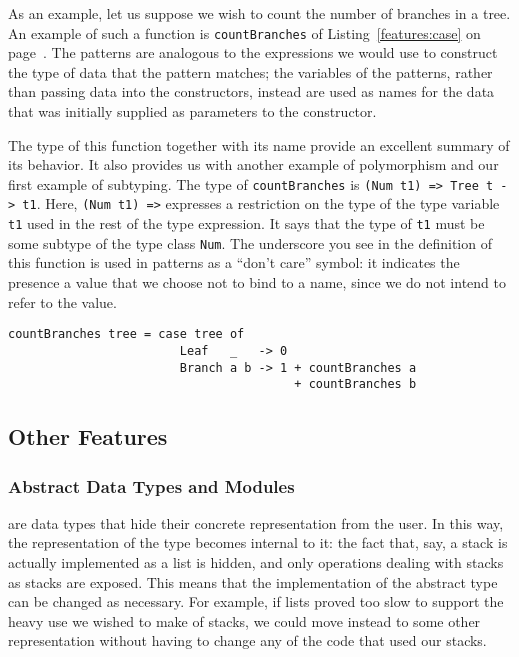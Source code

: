 As an example, let us suppose we wish to count the number of branches in a tree. An example of such a function is \lstinline{countBranches} of Listing~\ref{features:case} on page~\pageref{features:case}. The patterns are analogous to the expressions we would use to construct the type of data that the pattern matches; the variables of the patterns, rather than passing data into the constructors, instead are used as names for the data that was initially supplied as parameters to the constructor.

The type of this function together with its name provide an excellent summary of its behavior. It also provides us with another example of polymorphism and our first example of subtyping. The type of \lstinline{countBranches} is \lstinline{(Num t1) => Tree t -> t1}. Here, \lstinline{(Num t1) =>} expresses a restriction on the type of the type variable \lstinline{t1} used in the rest of the type expression. It says that the type of \lstinline{t1} must be some subtype of the type class \lstinline{Num}. The underscore you see in the definition of this function is used in patterns as a ``don't care'' symbol: it indicates the presence a value that we choose not to bind to a name, since we do not intend to refer to the value.

\begin{lstlisting}[float,caption={Pattern-matching via \code{case}},label={features:case}]
countBranches tree = case tree of
                        Leaf   _   -> 0
                        Branch a b -> 1 + countBranches a
                                        + countBranches b
\end{lstlisting}

\subsection{Other Features}
\subsubsection{Abstract Data Types and Modules}
 are data types that hide their concrete representation from the user. In this way, the representation of the type becomes internal to it: the fact that, say, a stack is actually implemented as a list is hidden, and only operations dealing with stacks as stacks are exposed. This means that the implementation of the abstract type can be changed as necessary. For example, if lists proved too slow to support the heavy use we wished to make of stacks, we could move instead to some other representation without having to change any of the code that used our stacks.

